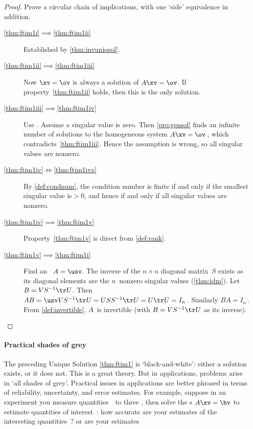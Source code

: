 \begin{proof} 
Prove a circular chain of implications, with one `side' equivalence in addition. 
\begin{description}
\item[\ref{thm:ftim1i}$\implies$\ref{thm:ftim1ii}]
Established by \cref{thm:invuniqsol}.
\item[\ref{thm:ftim1ii}$\implies$\ref{thm:ftim1iii}]
Now \(\xv=\ov\) is always a solution of \(A\xv=\ov\).  If property~\ref{thm:ftim1ii} holds, then this is the only solution.
\item[\ref{thm:ftim1iii}$\implies$\ref{thm:ftim1iv}]
Use .  
Assume a singular value is zero. 
Then \cref{pro:gensol} finds an infinite number of solutions to the homogeneous system \(A\xv=\ov\)\,, which contradicts~\ref{thm:ftim1iii}.
Hence the assumption is wrong, so all singular values are nonzero.
\item[\ref{thm:ftim1iv}$\iff$\ref{thm:ftim1ivx}]
By \cref{def:condnum}, the condition number is finite if and only if the smallest singular value is\({}>0\), and hence if and only if all singular values are nonzero.
\item[\ref{thm:ftim1iv}$\implies$\ref{thm:ftim1v}]
Property~\ref{thm:ftim1v} is direct from \cref{def:rank}.
\item[\ref{thm:ftim1v}$\implies$\ref{thm:ftim1i}]
Find an \svd\ \(A=\usv\).  
The inverse of the \(n\times n\) diagonal matrix~\(S\) exists as its diagonal elements are the \(n\)~nonzero singular values (\cref{thm:idm}). 
Let \(B=VS^{-1}\tr U\).
Then \(AB=\usv VS^{-1}\tr U=USS^{-1}\tr U=U\tr U=I_n\)\,.  
Similarly \(BA=I_n\)\,.  
From \cref{def:invertible}, \(A\)~is invertible (with \(B=VS^{-1}\tr U\) as its inverse).
\end{description}
\end{proof}



\paragraph{Practical shades of grey}
The preceding Unique Solution \cref{thm:ftim1} is `black-and-white': either a solution exists, or it does not.
This is a great theory.
But in applications, problems arise in `all shades of grey'.
Practical issues in applications are better phrased in terms of reliability, uncertainty, and error estimates.
For example, suppose in an experiment you measure quantities~\bv\ to three , then solve the s \(A\xv=\bv\) to estimate quantities of interest~\xv: how accurate are your estimates of the interesting quantities~\xv? or are your estimates 

